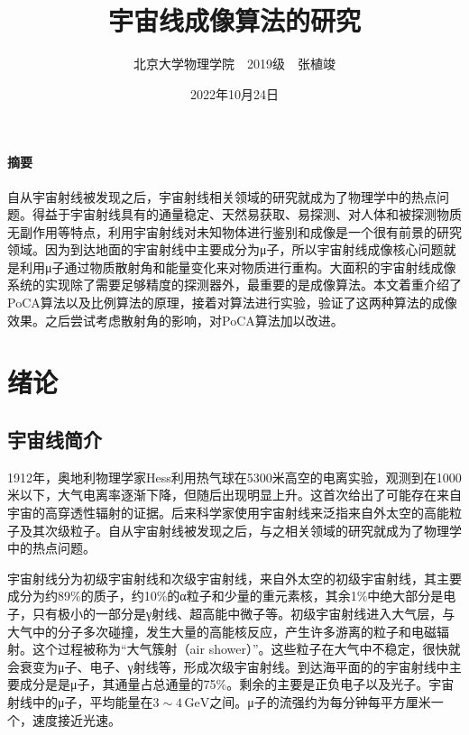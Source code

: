 \documentclass[fontset=none,zihao=-4]{ctexart}
\begin{document}
\title{\boldsong\Large 宇宙线成像算法的研究}
\author{ 北京大学物理学院\ \ 2019级\ \ 张植竣}
\date{2022年10月24日}

\maketitle

\paragraph*{摘要}

自从宇宙射线被发现之后，宇宙射线相关领域的研究就成为了物理学中的热点问题。得益于宇宙射线具有的通量稳定、天然易获取、易探测、对人体和被探测物质无副作用等特点，利用宇宙射线对未知物体进行鉴别和成像是一个很有前景的研究领域。因为到达地面的宇宙射线中主要成分为μ子，所以宇宙射线成像核心问题就是利用μ子通过物质散射角和能量变化来对物质进行重构。大面积的宇宙射线成像系统的实现除了需要足够精度的探测器外，最重要的是成像算法。本文着重介绍了PoCA算法以及比例算法的原理，接着对算法进行实验，验证了这两种算法的成像效果。之后尝试考虑散射角的影响，对PoCA算法加以改进。

\clearpage\section{绪论}

\subsection{宇宙线简介}

1912年，奥地利物理学家Hess利用热气球在5300米高空的电离实验，观测到在1000米以下，大气电离率逐渐下降，但随后出现明显上升。这首次给出了可能存在来自宇宙的高穿透性辐射的证据。后来科学家使用宇宙射线来泛指来自外太空的高能粒子及其次级粒子。自从宇宙射线被发现之后，与之相关领域的研究就成为了物理学中的热点问题。

宇宙射线分为初级宇宙射线和次级宇宙射线，来自外太空的初级宇宙射线，其主要成分为约89\%的质子，约10\%的α粒子和少量的重元素核，其余1\%中绝大部分是电子，只有极小的一部分是γ射线、超高能中微子等。初级宇宙射线进入大气层，与大气中的分子多次碰撞，发生大量的高能核反应，产生许多游离的粒子和电磁辐射。这个过程被称为“大气簇射（air shower）”。这些粒子在大气中不稳定，很快就会衰变为μ子、电子、γ射线等，形成次级宇宙射线。到达海平面的的宇宙射线中主要成分是是μ子，其通量占总通量的75\%。剩余的主要是正负电子以及光子。宇宙射线中的μ子，平均能量在$3 \sim 4\,\mathrm{GeV}$之间。μ子的流强约为每分钟每平方厘米一个，速度接近光速。
\end{document}
